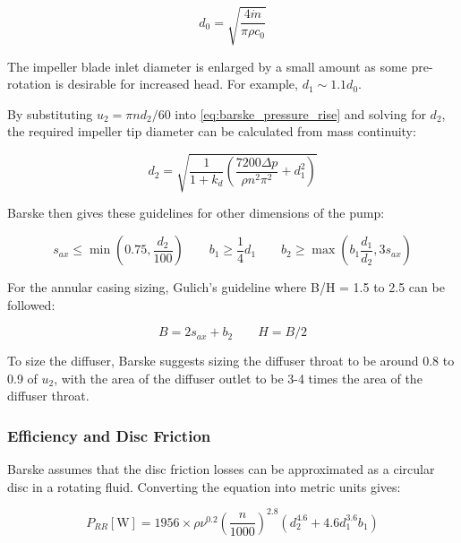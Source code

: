 \begin{equation}
    d_0 = \sqrt{\frac{4\dot{m}}{\pi \rho c_0}}
    \label{eq:barske_inlet_diameter}
\end{equation}

The impeller blade inlet diameter is enlarged by a small amount as some pre-rotation is desirable for increased head. For example, $d_1\sim1.1d_0$.

By substituting $u_2=\pi n d_2 / 60$ into \cref{eq:barske_pressure_rise} and solving for $d_2$, the required impeller tip diameter can be calculated from mass continuity:

\begin{equation}
    d_2 = \sqrt{\frac{1}{1+k_d}\left(\frac{7200\Delta p}{\rho n^2\pi^2} + d_1^2\right)}
    \label{eq:barske_tip_diameter}
\end{equation}

Barske then gives these guidelines for other dimensions of the pump:

\begin{equation}
    s_{ax} \leq \min{\left(0.75, \frac{d_2}{100}\right)} \qquad
    b_1 \geq \frac{1}{4} d_1 \qquad
    b_2 \geq \max{\left(b_1 \frac{d_1}{d_2}, 3s_{ax}\right)}
    \label{eq:blade_height}
\end{equation}

For the annular casing sizing, Gulich's guideline where B/H = 1.5 to 2.5 can be followed:

\begin{equation}
    B = 2 s_{ax} + b_2 \qquad
    H = B / 2
\end{equation}

To size the diffuser, Barske suggests sizing the diffuser throat to be around 0.8 to 0.9 of $u_2$, with the area of the diffuser outlet to be 3-4 times the area of the diffuser throat.

\subsubsection{Efficiency and Disc Friction}

Barske assumes that the disc friction losses can be approximated as a circular disc in a rotating fluid. Converting the equation into metric units gives:

\begin{equation}
    P_{RR} [\mathrm{W}] = 1956\times\rho\nu^{0.2}\left(\frac{n}{1000}\right)^{2.8}\left(d_2^{4.6}+4.6d_1^{3.6}b_1\right)
    \label{eq:barske_disc_friction}
\end{equation}

